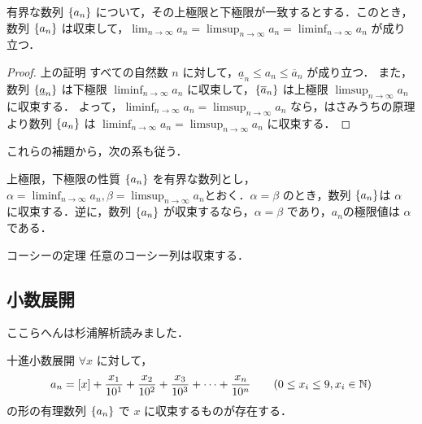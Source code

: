 \documentclass[xelatex,ja=standard,jafont=noto]{bxjsarticle}
\begin{document}
  \begin{lemma}{}{}
    有界な数列 $\{a_n\}$ について，その上極限と下極限が一致するとする．このとき，数列 $\{a_n\}$ は収束して，$\displaystyle \lim_{n \to \infty} a_n = \limsup_{n \to \infty} a_n = \liminf_{n \to \infty} a_n$ が成り立つ．  
  \end{lemma}

  \begin{proof}{上の証明}{}
    すべての自然数 $n$ に対して，$\underline{a}_n \leq a_n \leq \overline{a}_n$ が成り立つ．
    また，数列 $\{\underline{a}_n\}$ は下極限 $\displaystyle \liminf_{n \to \infty} a_n$  に収束して，$\{\overline{a}_n\}$ は上極限 $\displaystyle \limsup_{n \to \infty} a_n$ に収束する．
    よって，$\displaystyle \liminf_{n \to \infty} a_n= \displaystyle \limsup_{n \to \infty} a_n$ なら，はさみうちの原理より数列 $\{a_n\}$ は $\displaystyle \liminf_{n \to \infty} a_n = \displaystyle \limsup_{n \to \infty} a_n$ に収束する．
  \end{proof}
  
  これらの補題から，次の系も従う．

  \begin{corollary}{上極限，下極限の性質}{}
    $\{a_n\}$ を有界な数列とし，$\alpha = \displaystyle \liminf_{n \to \infty} a_n, \beta = \displaystyle \limsup_{n \to \infty} a_n$とおく．$\alpha = \beta$ のとき，数列 $\{a_n\} $は $\alpha$ に収束する．逆に，数列 $\{a_n\}$ が収束するなら，$\alpha = \beta$ であり，${a_n}$の極限値は $\alpha$ である．
  \end{corollary}

  \begin{theorem}{コーシーの定理}{}
   任意のコーシー列は収束する．
  \end{theorem}

  \subsection{小数展開}
  ここらへんは杉浦解析読みました．

  \begin{theorem}{十進小数展開}{}
   $\forall x$ に対して，
   \begin{align}
    \centering
    a_n = [x] + \frac{x_1}{10^1} + \frac{x_2}{10^2} + \frac{x_3}{10^3} + \cdots + \frac{x_n}{10^n} \hspace{20pt} (0 \leq x_i \leq 9, x_i \in \N) 
   \end{align}
の形の有理数列 $\{a_n\}$ で $x$ に収束するものが存在する．
  \end{theorem}
  
\end{document}
